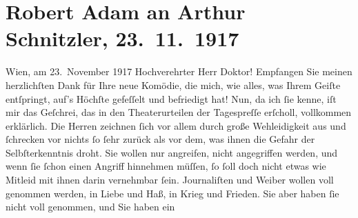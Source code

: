 

         \newcommand{\erwaehnteOrte}{Orte: Wien}
         \newcommand{\erwaehnteWerke}{Werke: Fink und Fliederbusch. Komödie in drei Akten}
               \section[Robert Adam an Arthur Schnitzler, 23. 11. 1917]{ Robert Adam an Arthur Schnitzler, 23. 11. 1917}\nopagebreak{}\rehead{ }\begin{ledgroupsized}[t]{13cm}\normalsize\beginnumbering \toendnotes[C]{\smallbreak\pagebreak[2]} 
\toendnotes[C]{\smallbreak}\pstart
           \raggedleft{}{\pb}Wien, am 23. November 1917\pend
           \pstart\center{}Hochverehrter Herr Doktor!\pend\pstart
           Empfangen Sie meinen herzlichſten Dank für Ihre neue Komödie, die mich, wie alles, was Ihrem Geiſte entſpringt,
               auf’s Höchſte gefeſſelt und befriedigt hat!\pend
           \pstart
           Nun, da ich ſie kenne, iſt mir das Geſchrei, das in den Theaterurteilen der
               Tagespreſſe erſcholl, vollkommen erklärlich. Die Herren zeichnen ſich vor allem durch
               große Wehleidigkeit aus und ſchrecken vor nichts ſo ſehr zurück als vor dem, was
               ihnen die Gefahr der Selbſterkenntnis droht. Sie wollen nur angreifen, nicht
               angegriffen werden, und wenn ſie ſchon einen Angriff hinnehmen müſſen, ſo ſoll doch
               nicht etwas wie Mitleid mit ihnen {\pb}darin
               vernehmbar ſein. Journaliſten und Weiber wollen voll genommen werden, in Liebe und
               Haß, in Krieg und Frieden. Sie aber haben ſie nicht voll genommen, und Sie haben ein

\end{ledgroupsized}
